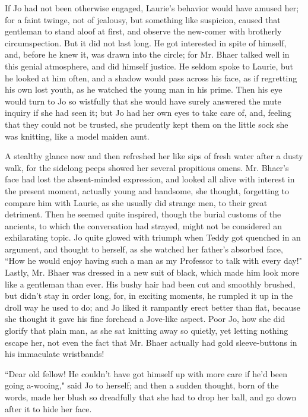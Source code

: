 If Jo had not been otherwise engaged, Laurie's behavior
would have amused her; for a faint twinge, not of jealousy, but
something like suspicion, caused that gentleman to stand aloof at first,
and observe the new-comer with brotherly circumspection. But it did not
last long. He got interested in spite of himself, and, before he knew
it, was drawn into the circle; for Mr. Bhaer talked well in this genial
atmosphere, and did himself justice. He seldom spoke to Laurie, but he
looked at him often, and a shadow would pass across his face, as if
regretting his own lost youth, as he watched the young man in his prime.
Then his eye would turn to Jo so wistfully that she would have surely
answered the mute inquiry if she had seen it; but Jo had her own eyes to
take care of, and, feeling that they could not be trusted, she prudently
kept them on the little sock she was knitting, like a model maiden aunt.

A stealthy glance now and then refreshed her like sips of fresh water
after a dusty walk, for the sidelong peeps showed her several propitious
omens. Mr. Bhaer's face had lost the absent-minded
expression, and looked all alive with interest in the present moment,
actually young and handsome, she thought, forgetting to compare him with
Laurie, as she usually did strange men, to their great detriment. Then
he seemed quite inspired, though the burial customs of the ancients, to
which the conversation had strayed, might not be considered an
exhilarating topic. Jo quite glowed with triumph when Teddy got quenched
in an argument, and thought to herself, as she watched her
father's absorbed face, ``How he would enjoy having such
a man as my Professor to talk with every day!" Lastly, Mr. Bhaer was
dressed in a new suit of black, which made him look more like a
gentleman than ever. His bushy hair had been cut and smoothly brushed,
but didn't stay in order long, for, in exciting moments,
he rumpled it up in the droll way he used to do; and Jo liked it
rampantly erect better than flat, because she thought it gave his fine
forehead a Jove-like aspect. Poor Jo, how she did glorify that plain
man, as she sat knitting away so quietly, yet letting nothing escape
her, not even the fact that Mr. Bhaer actually had gold sleeve-buttons
in his immaculate wristbands!

``Dear old fellow! He couldn't have got himself up with
more care if he'd been going a-wooing," said Jo to
herself; and then a sudden thought, born of the words, made her blush so
dreadfully that she had to drop her ball, and go down after it to hide
her face.

